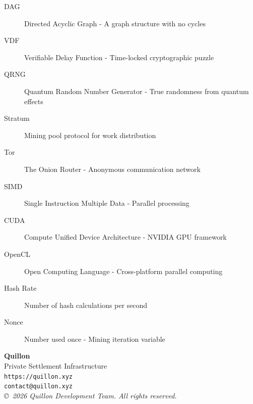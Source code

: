 \documentclass[11pt,a4paper]{article}
\begin{document}
\begin{description}
    \item[DAG] Directed Acyclic Graph - A graph structure with no cycles
    \item[VDF] Verifiable Delay Function - Time-locked cryptographic puzzle
    \item[QRNG] Quantum Random Number Generator - True randomness from quantum effects
    \item[Stratum] Mining pool protocol for work distribution
    \item[Tor] The Onion Router - Anonymous communication network
    \item[SIMD] Single Instruction Multiple Data - Parallel processing
    \item[CUDA] Compute Unified Device Architecture - NVIDIA GPU framework
    \item[OpenCL] Open Computing Language - Cross-platform parallel computing
    \item[Hash Rate] Number of hash calculations per second
    \item[Nonce] Number used once - Mining iteration variable
\end{description}

\vspace{2cm}

\begin{center}
\Large
\textbf{Quillon}\\[0.5cm]
\normalsize
Private Settlement Infrastructure\\[0.3cm]
\texttt{https://quillon.xyz}\\[0.2cm]
\texttt{contact@quillon.xyz}\\[0.5cm]
\textit{\copyright\ 2026 Quillon Development Team. All rights reserved.}
\end{center}
\end{document}
